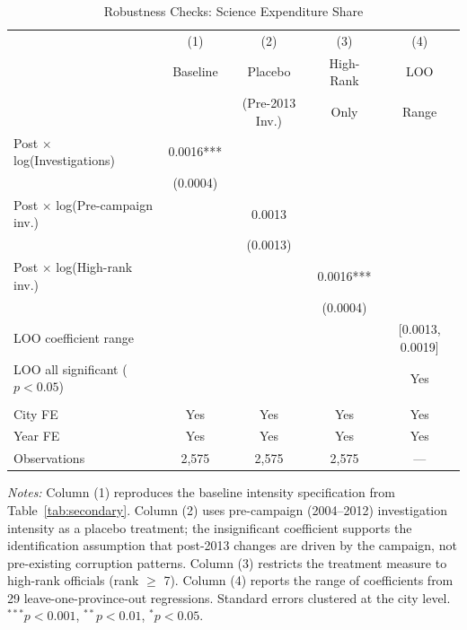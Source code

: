 \begin{table}[t]
\centering
\caption{Robustness Checks: Science Expenditure Share}
\label{tab:robust}
\small
\begin{tabular}{lcccc}
\hline\hline
    & (1) & (2) & (3) & (4) \\
    & Baseline & Placebo & High-Rank & LOO \\
    & & (Pre-2013 Inv.) & Only & Range \\
\hline
    Post $\times$ log(Investigations) & 0.0016*** & & & \\
    & (0.0004) & & & \\
    Post $\times$ log(Pre-campaign inv.) & & 0.0013 & & \\
    & & (0.0013) & & \\
    Post $\times$ log(High-rank inv.) & & & 0.0016*** & \\
    & & & (0.0004) & \\
    LOO coefficient range & & & & [0.0013, 0.0019] \\
    LOO all significant ($p < 0.05$) & & & & Yes \\
    \\
    City FE & Yes & Yes & Yes & Yes \\
    Year FE & Yes & Yes & Yes & Yes \\
    Observations & 2,575 & 2,575 & 2,575 & --- \\
\hline\hline
\end{tabular}
\begin{tablenotes}
\item \textit{Notes:} Column (1) reproduces the baseline intensity specification from Table~\ref{tab:secondary}.
Column (2) uses pre-campaign (2004--2012) investigation intensity as a placebo treatment;
the insignificant coefficient supports the identification assumption that post-2013 changes
are driven by the campaign, not pre-existing corruption patterns.
Column (3) restricts the treatment measure to high-rank officials (rank $\geq$ 7).
Column (4) reports the range of coefficients from 29 leave-one-province-out regressions.
Standard errors clustered at the city level. $^{***}p<0.001$, $^{**}p<0.01$, $^{*}p<0.05$.
\end{tablenotes}
\end{table}
